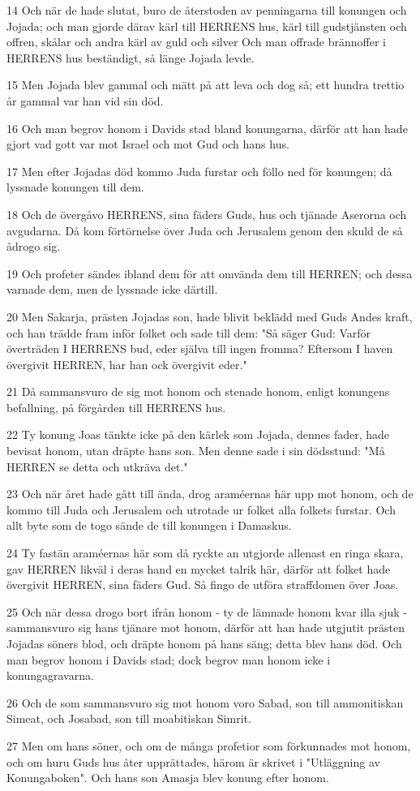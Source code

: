 \par 14 Och när de hade slutat, buro de återstoden av penningarna till konungen och Jojada; och man gjorde därav kärl till HERRENS hus, kärl till gudstjänsten och offren, skålar och andra kärl av guld och silver Och man offrade brännoffer i HERRENS hus beständigt, så länge Jojada levde.
\par 15 Men Jojada blev gammal och mätt på att leva och dog så; ett hundra trettio år gammal var han vid sin död.
\par 16 Och man begrov honom i Davids stad bland konungarna, därför att han hade gjort vad gott var mot Israel och mot Gud och hans hus.
\par 17 Men efter Jojadas död kommo Juda furstar och föllo ned för konungen; då lyssnade konungen till dem.
\par 18 Och de övergåvo HERRENS, sina fäders Guds, hus och tjänade Aserorna och avgudarna. Då kom förtörnelse över Juda och Jerusalem genom den skuld de så ådrogo sig.
\par 19 Och profeter sändes ibland dem för att omvända dem till HERREN; och dessa varnade dem, men de lyssnade icke därtill.
\par 20 Men Sakarja, prästen Jojadas son, hade blivit beklädd med Guds Andes kraft, och han trädde fram inför folket och sade till dem: "Så säger Gud: Varför överträden I HERRENS bud, eder själva till ingen fromma? Eftersom I haven övergivit HERREN, har han ock övergivit eder."
\par 21 Då sammansvuro de sig mot honom och stenade honom, enligt konungens befallning, på förgården till HERRENS hus.
\par 22 Ty konung Joas tänkte icke på den kärlek som Jojada, dennes fader, hade bevisat honom, utan dräpte hans son. Men denne sade i sin dödsstund: "Må HERREN se detta och utkräva det."
\par 23 Och när året hade gått till ända, drog araméernas här upp mot honom, och de kommo till Juda och Jerusalem och utrotade ur folket alla folkets furstar. Och allt byte som de togo sände de till konungen i Damaskus.
\par 24 Ty fastän araméernas här som då ryckte an utgjorde allenast en ringa skara, gav HERREN likväl i deras hand en mycket talrik här, därför att folket hade övergivit HERREN, sina fäders Gud. Så fingo de utföra straffdomen över Joas.
\par 25 Och när dessa drogo bort ifrån honom - ty de lämnade honom kvar illa sjuk - sammansvuro sig hans tjänare mot honom, därför att han hade utgjutit prästen Jojadas söners blod, och dräpte honom på hans säng; detta blev hans död. Och man begrov honom i Davids stad; dock begrov man honom icke i konungagravarna.
\par 26 Och de som sammansvuro sig mot honom voro Sabad, son till ammonitiskan Simeat, och Josabad, son till moabitiskan Simrit.
\par 27 Men om hans söner, och om de många profetior som förkunnades mot honom, och om huru Guds hus åter upprättades, härom är skrivet i "Utläggning av Konungaboken". Och hans son Amasja blev konung efter honom.

